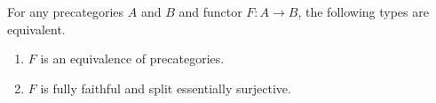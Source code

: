 \documentclass[hott-all.tex]{subfiles}
\begin{document}
\begin{lem}
  For any precategories $A$ and $B$ and functor $F:A\to B$, the following types are equivalent.
  \begin{enumerate}
  \item $F$ is an equivalence of precategories.
  \item $F$ is fully faithful and split essentially surjective.
  \end{enumerate}
\end{lem}
%
%
%
\end{document}
